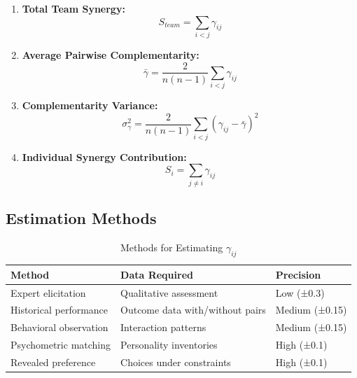 \begin{enumerate}
    \item \textbf{Total Team Synergy:}
    \begin{equation}
    S_{team} = \sum_{i<j} \gamma_{ij}
    \end{equation}

    \item \textbf{Average Pairwise Complementarity:}
    \begin{equation}
    \bar{\gamma} = \frac{2}{n(n-1)} \sum_{i<j} \gamma_{ij}
    \end{equation}

    \item \textbf{Complementarity Variance:}
    \begin{equation}
    \sigma^2_{\gamma} = \frac{2}{n(n-1)} \sum_{i<j} (\gamma_{ij} - \bar{\gamma})^2
    \end{equation}

    \item \textbf{Individual Synergy Contribution:}
    \begin{equation}
    S_i = \sum_{j \neq i} \gamma_{ij}
    \end{equation}
\end{enumerate}

\subsection{Estimation Methods}

\begin{table}[h]
\centering
\caption{Methods for Estimating $\gamma_{ij}$}
\label{tab:estimation}
\begin{tabular}{lll}
\toprule
\textbf{Method} & \textbf{Data Required} & \textbf{Precision} \\
\midrule
Expert elicitation & Qualitative assessment & Low (±0.3) \\
Historical performance & Outcome data with/without pairs & Medium (±0.15) \\
Behavioral observation & Interaction patterns & Medium (±0.15) \\
Psychometric matching & Personality inventories & High (±0.1) \\
Revealed preference & Choices under constraints & High (±0.1) \\
\bottomrule
\end{tabular}
\end{table}




